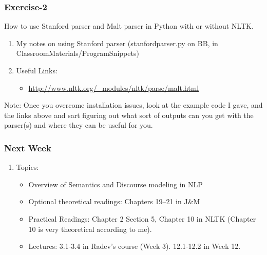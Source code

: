 \documentclass{beamer}
\begin{document}
\begin{frame}
\frametitle{Exercise-2}
How to use Stanford parser and Malt parser in Python with or without NLTK.
\begin{enumerate}
\item My notes on using Stanford parser (stanfordparser.py on BB, in ClassroomMaterials/ProgramSnippets)
\item Useful Links:
\begin{itemize}
\iten \url{http://www.nltk.org/_modules/nltk/parse/stanford.html}
\item \url{http://www.nltk.org/_modules/nltk/parse/malt.html}
\end{itemize}
\end{enumerate}
Note: Once you overcome installation issues, look at the example code I gave, and the links above and sart figuring out what sort of outputs can you get with the parser(s) and where they can be useful for you. 
\end{frame}

\begin{frame}
\frametitle{Next Week}
\begin{enumerate}
\item Topics: 
\begin{itemize}
\item Overview of Semantics and Discourse modeling in NLP
\item Optional theoretical readings: Chapters 19--21 in J\&M
\item Practical Readings: Chapter 2 Section 5, Chapter 10 in NLTK (Chapter 10 is very theoretical according to me).
\item Lectures: 3.1-3.4 in Radev's course (Week 3). 12.1-12.2 in Week 12.
\end{itemize}
\end{enumerate}
\end{frame}
\end{document}
